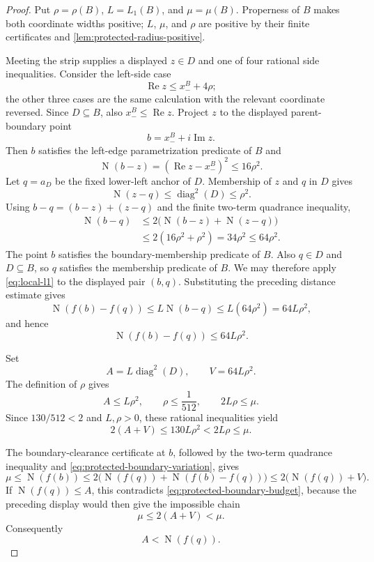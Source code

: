 \documentclass[11pt]{article}
\newcommand{\Norm}[1]{\operatorname{N}\!\left(#1\right)}
\newcommand{\Ree}{\operatorname{Re}}
\newcommand{\Imm}{\operatorname{Im}}
\newcommand{\diamq}{\operatorname{diag}^{2}}
\begin{document}
\begin{proof}
Put $\rho=\rho(B)$, $L=L_1(B)$, and $\mu=\mu(B)$.  Properness of $B$ makes
both coordinate widths positive; $L$, $\mu$, and $\rho$ are positive by
their finite certificates and \cref{lem:protected-radius-positive}.

Meeting the strip supplies a displayed $z\in D$ and one of four rational
side inequalities.  Consider the left-side case
\[
                  \Ree z\le x_-^B+4\rho;
\]
the other three cases are the same calculation with the relevant coordinate
reversed.  Since $D\subseteq B$, also $x_-^B\le\Ree z$.  Project $z$ to the
displayed parent-boundary point
\[
                         b=x_-^B+i\Imm z.
\]
Then $b$ satisfies the left-edge parametrization predicate of $B$ and
\[
             \Norm{b-z}=(\Ree z-x_-^B)^2\le16\rho^2.
\]
Let $q=a_D$ be the fixed lower-left anchor of $D$.  Membership of $z$ and
$q$ in $D$ gives
\[
                     \Norm{z-q}\le\diamq(D)\le\rho^2.
\]
Using $b-q=(b-z)+(z-q)$ and the finite two-term quadrance inequality,
\begin{align*}
 \Norm{b-q}
 &\le2\bigl(\Norm{b-z}+\Norm{z-q}\bigr)\\
 &\le2(16\rho^2+\rho^2)=34\rho^2\le64\rho^2.
\end{align*}
The point $b$ satisfies the boundary-membership predicate of $B$.  Also
$q\in D$ and $D\subseteq B$, so $q$ satisfies the membership predicate of
$B$.  We may therefore apply \eqref{eq:local-l1} to the displayed pair
$(b,q)$.  Substituting the preceding distance estimate gives
\[
 \Norm{f(b)-f(q)}\le L\Norm{b-q}\le L(64\rho^2)=64L\rho^2,
\]
and hence
\begin{equation}
\label{eq:protected-boundary-variation}
                 \Norm{f(b)-f(q)}\le64L\rho^2.
\end{equation}

Set
\[
                 A=L\diamq(D),\qquad V=64L\rho^2.
\]
The definition of $\rho$ gives
\[
 A\le L\rho^2,\qquad \rho\le\frac1{512},\qquad
 2L\rho\le\mu.
\]
Since $130/512<2$ and $L,\rho>0$, these rational inequalities yield
\begin{equation}
\label{eq:protected-boundary-budget}
       2(A+V)\le130L\rho^2<2L\rho\le\mu.
\end{equation}

The boundary-clearance certificate at $b$, followed by the two-term
quadrance inequality and
\eqref{eq:protected-boundary-variation}, gives
\[
 \mu\le\Norm{f(b)}
   \le2\bigl(\Norm{f(q)}+\Norm{f(b)-f(q)}\bigr)
   \le2\bigl(\Norm{f(q)}+V\bigr).
\]
If $\Norm{f(q)}\le A$, this contradicts
\eqref{eq:protected-boundary-budget}, because the preceding display would
then give the impossible chain
\[
                  \mu\le2(A+V)<\mu.
\]
Consequently
\begin{equation}
\label{eq:protected-anchor-dominates}
                         A<\Norm{f(q)}.
\end{equation}


\end{proof}
\end{document}
